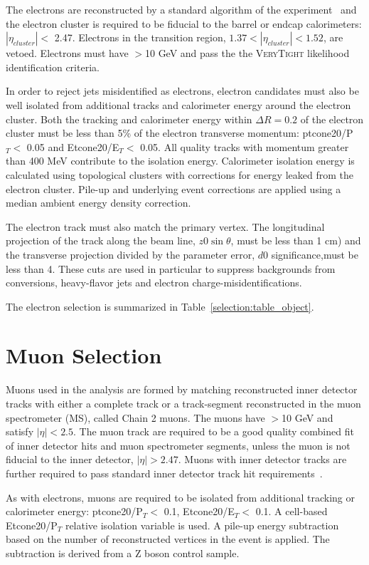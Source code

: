 The electrons are reconstructed by a standard algorithm of the
experiment~\cite{ATLAS-CONF-2014-032} and the electron cluster is required to be fiducial 
to the barrel or endcap calorimeters: $|\eta_{cluster}| < $ 2.47. Electrons
in the transition region, $1.37 < |\eta_{cluster}| < 1.52$, are vetoed.
Electrons must have \pt$>$10 GeV and pass the the \textsc{VeryTight} likelihood identification criteria.

In order to reject jets misidentified as electrons,
electron candidates  must also be well isolated from additional tracks and
calorimeter energy around the electron cluster. Both the tracking 
and calorimeter energy within $\Delta R=0.2$ of the electron
cluster must be less than 5\% of the electron transverse momentum: ptcone20/P$_T <$ 0.05 and Etcone20/E$_T <$ 0.05.
All quality tracks with momentum greater than 400 MeV contribute to the isolation
energy.  Calorimeter isolation energy is calculated
using topological clusters with corrections for energy leaked from the
electron cluster. Pile-up and underlying event corrections are applied using
a median ambient energy density correction.  

The electron track must also match the primary vertex. The longitudinal projection 
of the track along the beam line, $z0\sin{\theta}$, must be less than 1 cm) and the transverse projection divided by the
parameter error, $d0$ significance,must be less than 4. These cuts are used in particular to suppress backgrounds
from conversions, heavy-flavor jets and electron charge-misidentifications. 


The electron selection is summarized in Table~\ref{selection:table_object}. 


\section{Muon Selection}

Muons used in the analysis are formed by matching reconstructed inner detector
tracks with either a complete track or a track-segment reconstructed in the muon spectrometer (MS),
called Chain 2 muons. The muons have \pt$>$10 GeV and satisfy $|\eta| < 2.5$.
The muon track are required to be a good quality combined fit of inner detector hits and muon
spectrometer segments, unless the muon is not fiducial to the
inner detector, $|\eta| > 2.47$.  Muons with inner detector tracks are further required
to pass standard inner detector track hit requirements~\cite{MCP2012}.  

As with electrons, muons are required to be isolated from 
additional tracking or calorimeter energy: ptcone20/P$_T <$ 0.1, Etcone20/E$_T <$ 0.1. A cell-based Etcone20/P$_T$ relative
isolation variable is used. A pile-up energy subtraction based 
on the number of reconstructed vertices in the event is applied. The
subtraction is derived from a Z boson control sample.


